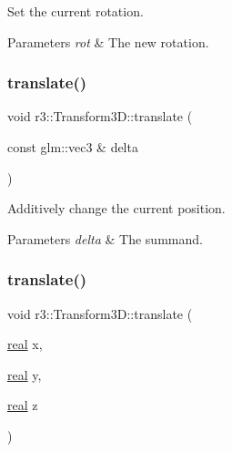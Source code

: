Set the current rotation. 


\begin{DoxyParams}{Parameters}
{\em rot} & The new rotation. \\
\hline
\end{DoxyParams}
\mbox{\label{classr3_1_1_transform3_d_a36ca89f7424b3efec3f2d5532c37f457}} 
\subsubsection{\texorpdfstring{translate()}{translate()}\hspace{0.1cm}{\footnotesize\ttfamily [1/2]}}
{\footnotesize\ttfamily void r3\+::\+Transform3\+D\+::translate (\begin{DoxyParamCaption}\item[{const glm\+::vec3 \&}]{delta }\end{DoxyParamCaption})}



Additively change the current position. 


\begin{DoxyParams}{Parameters}
{\em delta} & The summand. \\
\hline
\end{DoxyParams}
\mbox{\label{classr3_1_1_transform3_d_aab83077fb0b382391493aa59bdd2ce13}} 
\subsubsection{\texorpdfstring{translate()}{translate()}\hspace{0.1cm}{\footnotesize\ttfamily [2/2]}}
{\footnotesize\ttfamily void r3\+::\+Transform3\+D\+::translate (\begin{DoxyParamCaption}\item[{\mbox{\hyperlink{namespacer3_ab2016b3e3f743fb735afce242f0dc1eb}{real}}}]{x,  }\item[{\mbox{\hyperlink{namespacer3_ab2016b3e3f743fb735afce242f0dc1eb}{real}}}]{y,  }\item[{\mbox{\hyperlink{namespacer3_ab2016b3e3f743fb735afce242f0dc1eb}{real}}}]{z }\end{DoxyParamCaption})}



